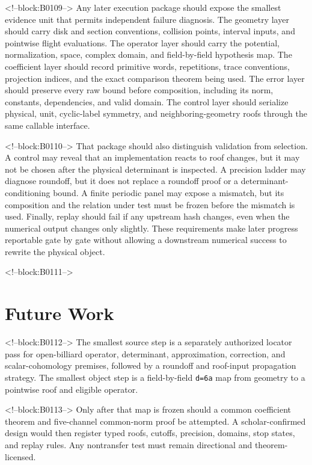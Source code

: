 \documentclass[11pt,a4paper]{article}
\begin{document}
<!--block:B0109-->
Any later execution package should expose the smallest evidence unit that permits independent failure diagnosis. The geometry layer should carry disk and section conventions, collision points, interval inputs, and pointwise flight evaluations. The operator layer should carry the potential, normalization, space, complex domain, and field-by-field hypothesis map. The coefficient layer should record primitive words, repetitions, trace conventions, projection indices, and the exact comparison theorem being used. The error layer should preserve every raw bound before composition, including its norm, constants, dependencies, and valid domain. The control layer should serialize physical, unit, cyclic-label symmetry, and neighboring-geometry roofs through the same callable interface.

<!--block:B0110-->
That package should also distinguish validation from selection. A control may reveal that an implementation reacts to roof changes, but it may not be chosen after the physical determinant is inspected. A precision ladder may diagnose roundoff, but it does not replace a roundoff proof or a determinant-conditioning bound. A finite periodic panel may expose a mismatch, but its composition and the relation under test must be frozen before the mismatch is used. Finally, replay should fail if any upstream hash changes, even when the numerical output changes only slightly. These requirements make later progress reportable gate by gate without allowing a downstream numerical success to rewrite the physical object.

<!--block:B0111-->
\section{Future Work}

<!--block:B0112-->
The smallest source step is a separately authorized locator pass for open-billiard operator, determinant, approximation, correction, and scalar-cohomology premises, followed by a roundoff and roof-input propagation strategy. The smallest object step is a field-by-field \texttt{d=6a} map from geometry to a pointwise roof and eligible operator.

<!--block:B0113-->
Only after that map is frozen should a common coefficient theorem and five-channel common-norm proof be attempted. A scholar-confirmed design would then register typed roofs, cutoffs, precision, domains, stop states, and replay rules. Any nontransfer test must remain directional and theorem-licensed.
\end{document}
